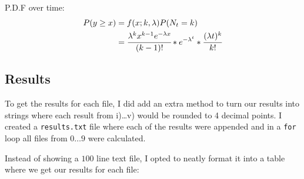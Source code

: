 \documentclass[11pt, letterpaper]{article}
\begin{document}
\begin{file}[q5.py]
	
\end{file}
\noindent P.D.F over time: 
\begin{equation}
	\begin{split}
		P(y \geq x) &= f(x;k, \lambda)P(N_t = k)\\
		&= \cfrac{\lambda^{k}x^{k-1}e^{-\lambda x}}{(k - 1)!} * e^{-\lambda^t} * \cfrac{(\lambda t)^k}{k!}
	\end{split}
\end{equation}

\subsection*{Results}
To get the results for each file, I did add an extra method to turn our results
into strings where each
result from i)\dots v) would be rounded to 4 decimal points. I created a
\verb|results.txt| file where each of the results
were appended and in a \verb|for| loop all files from $0\dots 9$ were
calculated.

\begin{file}[q5.py]
	
\end{file}

Instead of showing a $100$ line text file, I opted to neatly format it into a
table where we get our
results for each file:
\end{document}
